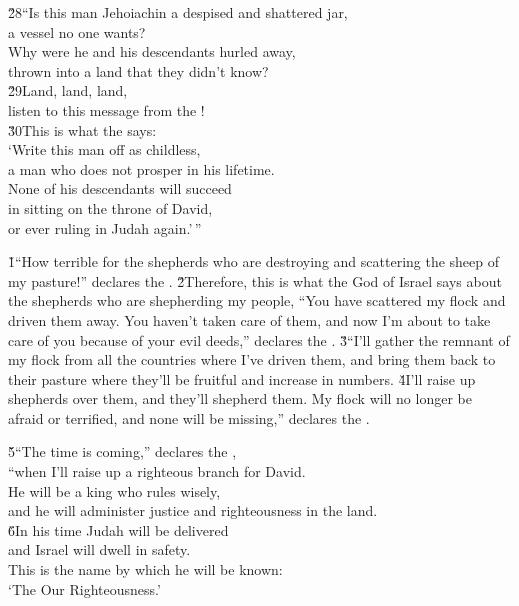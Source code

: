 \begin{poetry}
\poeml \v{28}``Is this man Jehoiachin a despised and shattered jar, \\
\poemll    a vessel no one wants? \\
\poeml Why were he and his descendants hurled away, \\
\poemll    thrown into a land that they didn't know? \\
\poeml \v{29}Land, land, land, \\
\poemll    listen to this message from the ! \\
\poeml \v{30}This is what the  says: \\
\poeml `Write this man off as childless, \\
\poemll    a man who does not prosper in his lifetime. \\
\poeml None of his descendants will succeed \\
\poemll    in sitting on the throne of David, \\
\poemlll       or ever ruling in Judah again.'\,''
\end{poetry}

\v{1}``How terrible for the shepherds who are destroying and scattering the sheep of my pasture!'' declares the . \v{2}Therefore, this is what the  God of Israel says about the shepherds who are shepherding my people, ``You have scattered my flock and driven them away. You haven't taken care of them, and now I'm about to take care of you because of your evil deeds,'' declares the . \v{3}``I'll gather the remnant of my flock from all the countries where I've driven them, and bring them back to their pasture where they'll be fruitful and increase in numbers. \v{4}I'll raise up shepherds over them, and they'll shepherd them. My flock will no longer be afraid or terrified, and none will be missing,'' declares the .

\begin{poetry}
\poeml \v{5}``The time is coming,'' declares the , \\
\poemll    ``when I'll raise up a righteous branch for David. \\
\poeml He will be a king who rules wisely, \\
\poemll    and he will administer justice and righteousness in the land. \\
\poeml \v{6}In his time Judah will be delivered \\
\poemll    and Israel will dwell in safety. \\
\poeml This is the name by which he will be known: \\
\poemll    `The  Our Righteousness.'
\end{poetry}

